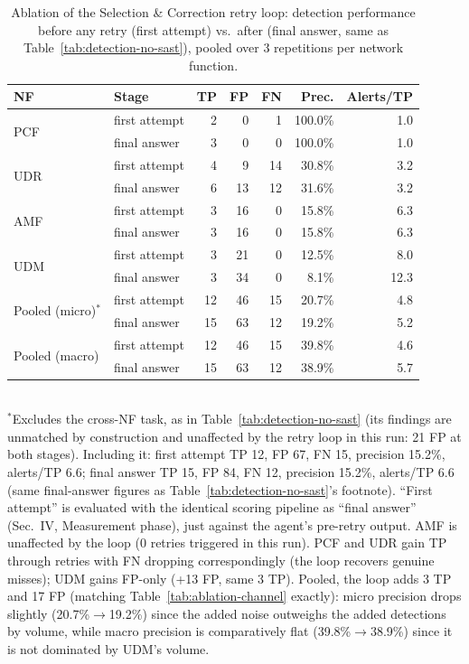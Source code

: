 \begin{table}[t]
\centering
\caption{Ablation of the Selection \& Correction retry loop: detection performance before any retry (first attempt) vs.\ after (final answer, same as Table~\ref{tab:detection-no-sast}), pooled over 3 repetitions per network function.}
\label{tab:ablation-retry}
\begin{tabular}{llrrrrr}
\toprule
NF & Stage & TP & FP & FN & Prec. & Alerts/TP \\
\midrule
\multirow{2}{*}{PCF} & first attempt & 2 & 0  & 1 & 100.0\% & 1.0 \\
                      & final answer   & 3 & 0  & 0 & 100.0\% & 1.0 \\
\midrule
\multirow{2}{*}{UDR} & first attempt & 4 & 9  & 14 & 30.8\% & 3.2 \\
                      & final answer   & 6 & 13 & 12 & 31.6\% & 3.2 \\
\midrule
\multirow{2}{*}{AMF} & first attempt & 3 & 16 & 0  & 15.8\% & 6.3 \\
                      & final answer   & 3 & 16 & 0  & 15.8\% & 6.3 \\
\midrule
\multirow{2}{*}{UDM} & first attempt & 3 & 21 & 0  & 12.5\% & 8.0 \\
                      & final answer   & 3 & 34 & 0  & 8.1\%  & 12.3 \\
\midrule
\multirow{2}{*}{Pooled (micro)$^{*}$} & first attempt & 12 & 46 & 15 & 20.7\% & 4.8 \\
                                       & final answer   & 15 & 63 & 12 & 19.2\% & 5.2 \\
\multirow{2}{*}{Pooled (macro)} & first attempt & 12 & 46 & 15 & 39.8\% & 4.6 \\
                                 & final answer   & 15 & 63 & 12 & 38.9\% & 5.7 \\
\bottomrule
\end{tabular}
\\[2pt]
\footnotesize{$^{*}$Excludes the cross-NF task, as in Table~\ref{tab:detection-no-sast} (its findings are unmatched by construction and unaffected by the retry loop in this run: 21 FP at both stages). Including it: first attempt TP 12, FP 67, FN 15, precision 15.2\%, alerts/TP 6.6; final answer TP 15, FP 84, FN 12, precision 15.2\%, alerts/TP 6.6 (same final-answer figures as Table~\ref{tab:detection-no-sast}'s footnote). ``First attempt'' is evaluated with the identical scoring pipeline as ``final answer'' (Sec.~IV, Measurement phase), just against the agent's pre-retry output. AMF is unaffected by the loop (0 retries triggered in this run). PCF and UDR gain TP through retries with FN dropping correspondingly (the loop recovers genuine misses); UDM gains FP-only (+13 FP, same 3 TP). Pooled, the loop adds 3 TP and 17 FP (matching Table~\ref{tab:ablation-channel} exactly): micro precision drops slightly (20.7\%$\to$19.2\%) since the added noise outweighs the added detections by volume, while macro precision is comparatively flat (39.8\%$\to$38.9\%) since it is not dominated by UDM's volume.}
\end{table}

